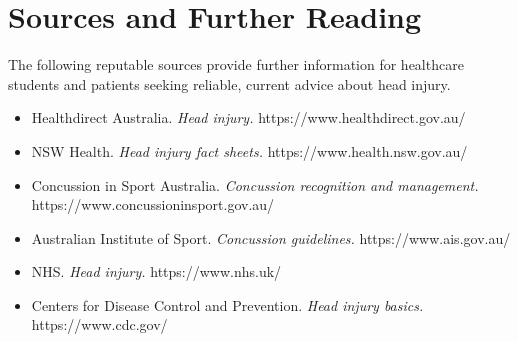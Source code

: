\section*{Sources and Further Reading}
The following reputable sources provide further information for healthcare students and patients seeking reliable, current advice about head injury.

\begin{itemize}
    \item Healthdirect Australia. \textit{Head injury.} https://www.healthdirect.gov.au/
    \item NSW Health. \textit{Head injury fact sheets.} https://www.health.nsw.gov.au/
    \item Concussion in Sport Australia. \textit{Concussion recognition and management.} https://www.concussioninsport.gov.au/
    \item Australian Institute of Sport. \textit{Concussion guidelines.} https://www.ais.gov.au/
    \item NHS. \textit{Head injury.} https://www.nhs.uk/
    \item Centers for Disease Control and Prevention. \textit{Head injury basics.} https://www.cdc.gov/
\end{itemize}
